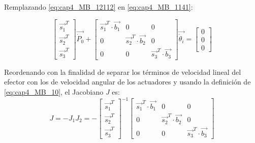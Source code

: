     Remplazando \ref{eq:cap4_MB_12112} en \ref{eq:cap4_MB_1141}:
    
        \begin{equation}
         \begin{bmatrix}
                \overrightarrow{s_{1}}^T \\
                \overrightarrow{s_{2}}^T \\
                \overrightarrow{s_{3}}^T
            \end{bmatrix}\overrightarrow{\dot{P}_0} +\begin{bmatrix}
                \overrightarrow{s_{1}}^{T} \cdot \overrightarrow{b_{1}} &0&0\\
                0 &\overrightarrow{s_{2}}^{T}\cdot \overrightarrow{b_{2}}&0\\
                0 &0&\overrightarrow{s_{3}}^{T}\cdot \overrightarrow{b_{3}}
            \end{bmatrix}\overrightarrow{\dot{\theta}_i} =         \begin{bmatrix}
                0 \\
                0 \\
                0
            \end{bmatrix}
        \label{eq:cap4_MB_12112234}
    \end{equation}
    
   Reordenando con la finalidad de separar los términos de velocidad lineal del efector con los de velocidad angular de los actuadores y usando la definición de \ref{eq:cap4_MB_10}, el Jacobiano $J$ es:
    \begin{equation}
        J = -J_{1}J_{2}=-
        {\begin{bmatrix}
                \overrightarrow{s_{1}}^T \\
                \overrightarrow{s_{2}}^T \\
                \overrightarrow{s_{3}}^T
            \end{bmatrix}}^{-1}
        {\begin{bmatrix}
                \overrightarrow{s_{1}}^{T} \cdot \overrightarrow{b_{1}} &0&0\\
                0 &\overrightarrow{s_{2}}^{T}\cdot \overrightarrow{b_{2}}&0\\
                0 &0&\overrightarrow{s_{3}}^{T}\cdot \overrightarrow{b_{3}}
            \end{bmatrix}}
        \label{eq:cap4_MB_14}
    \end{equation}  
    
